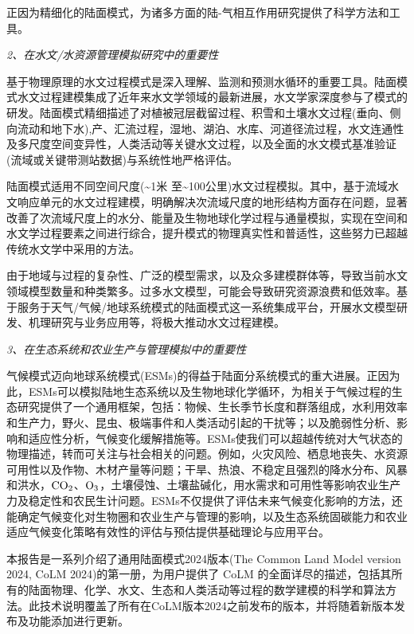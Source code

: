 正因为精细化的陆面模式，为诸多方面的陆-气相互作用研究提供了科学方法和工具。

\textit{2、在水文/水资源管理模拟研究中的重要性}

基于物理原理的水文过程模式是深入理解、监测和预测水循环的重要工具。陆面模式水文过程建模集成了近年来水文学领域的最新进展，水文学家深度参与了模式的研发。陆面模式精细描述了对植被冠层截留过程、积雪和土壤水文过程(垂向、侧向流动和地下水),产、汇流过程，湿地、湖泊、水库、河道径流过程，水文连通性及多尺度空间变异性，人类活动等关键水文过程，以及全面的水文模式基准验证(流域或关键带测站数据)与系统性地严格评估。

陆面模式适用不同空间尺度(\textasciitilde1米 至\textasciitilde100公里)水文过程模拟。其中，基于流域水文响应单元的水文过程建模，明确解决次流域尺度的地形结构方面存在问题，显著改善了次流域尺度上的水分、能量及生物地球化学过程与通量模拟，实现在空间和水文学过程要素之间进行综合，提升模式的物理真实性和普适性，这些努力已超越传统水文学中采用的方法。

由于地域与过程的复杂性、广泛的模型需求，以及众多建模群体等，导致当前水文领域模型数量和种类繁多。过多水文模型，可能会导致研究资源浪费和低效率。基于服务于天气/气候/地球系统模式的陆面模式这一系统集成平台，开展水文模型研发、机理研究与业务应用等，将极大推动水文过程建模。

\textit{3、在生态系统和农业生产与管理模拟中的重要性}

气候模式迈向地球系统模式(ESMs)的得益于陆面分系统模式的重大进展。正因为此，ESMs可以模拟陆地生态系统以及生物地球化学循环，为相关于气候过程的生态研究提供了一个通用框架，包括：物候、生长季节长度和群落组成，水利用效率和生产力，野火、昆虫、极端事件和人类活动引起的干扰等；以及脆弱性分析、影响和适应性分析，气候变化缓解措施等。ESMs使我们可以超越传统对大气状态的物理描述，转而可关注与社会相关的问题。例如，火灾风险、栖息地丧失、水资源可用性以及作物、木材产量等问题；干旱、热浪、不稳定且强烈的降水分布、风暴和洪水，$\rm CO_2$、$\rm O_3$，土壤侵蚀、土壤盐碱化，用水需求和可用性等影响农业生产力及稳定性和农民生计问题。ESMs不仅提供了评估未来气候变化影响的方法，还能确定气候变化对生物圈和农业生产与管理的影响，以及生态系统固碳能力和农业适应气候变化策略有效性的评估与预估提供基础理论与应用平台。

本报告是一系列介绍了通用陆面模式2024版本(The Common Land Model version 2024, CoLM 2024)的第一册，为用户提供了 CoLM 的全面详尽的描述，包括其所有的陆面物理、化学、水文、生态和人类活动等过程的数学建模的科学和算法方法。此技术说明覆盖了所有在CoLM版本2024之前发布的版本，并将随着新版本发布及功能添加进行更新。
